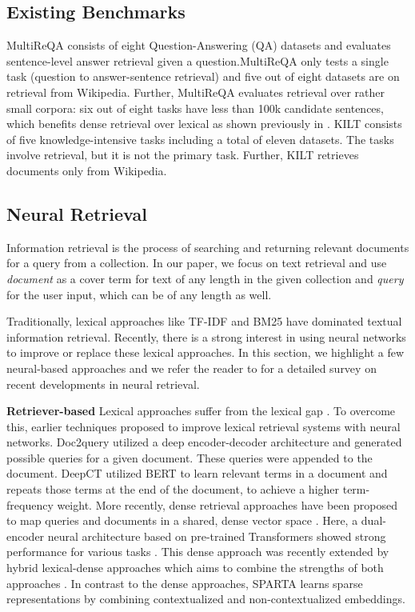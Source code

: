 \documentclass[11pt]{article}
\begin{document}
\subsection{Existing Benchmarks}

MultiReQA \cite{guo2020multireqa} consists of eight Question-Answering (QA) datasets and evaluates sentence-level answer retrieval given a question.MultiReQA only tests a single task (question to answer-sentence retrieval) and five out of eight datasets are on retrieval from Wikipedia. Further, MultiReQA evaluates retrieval over rather small corpora: six out of eight tasks have less than 100k candidate sentences, which benefits dense retrieval over lexical as shown previously in \cite{reimers2020curse}. 
KILT \cite{petroni2020kilt} consists of five knowledge-intensive tasks including a total of eleven datasets. The tasks involve retrieval, but it is not the primary task. Further, KILT retrieves documents only from Wikipedia. 



\subsection{Neural Retrieval}
Information retrieval is the process of searching and returning relevant documents for a query from a collection. In our paper, we focus on text retrieval and use \textit{document} as a cover term for text of any length in the given collection and \textit{query} for the user input, which can be of any length as well. 

Traditionally, lexical approaches like TF-IDF and BM25 \cite{bm25} have dominated textual information retrieval. Recently, there is a strong interest in using neural networks to improve or replace these lexical approaches. In this section, we highlight a few neural-based approaches and we refer the reader to  for a detailed survey on recent developments in neural retrieval.


\textbf{Retriever-based} \quad Lexical approaches suffer from the lexical gap \cite{berger2000bridging}. To overcome this, earlier techniques proposed to improve lexical retrieval systems with neural networks. Doc2query \cite{nogueira2019document} utilized a deep encoder-decoder architecture and generated possible queries for a given document. These queries were appended to the document. DeepCT \cite{10.1145/3397271.3401204} utilized BERT to learn relevant terms in a document and repeats those terms at the end of the document, to achieve a higher term-frequency weight. More recently, dense retrieval approaches have been proposed to map queries and documents in a shared, dense vector space \cite{gillick2018endtoend}. Here, a dual-encoder neural architecture based on pre-trained Transformers showed strong performance for various tasks  \cite{guo2020multireqa, karpukhin-etal-2020-dense, liang2020embeddingbased, ma2021zeroshot}. This dense approach was recently extended by hybrid lexical-dense approaches which aims to combine the strengths of both approaches \cite{gao2020complementing, seo-etal-2019-real, luan2021sparse}. In contrast to the dense approaches, SPARTA \cite{zhao2020sparta} learns sparse representations by combining contextualized and non-contextualized embeddings.
\end{document}
